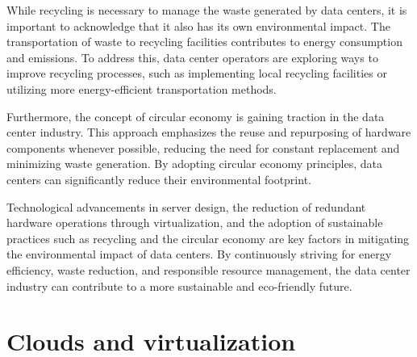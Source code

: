 \documentclass[
  a4paper,  %
  twoside,  %
  bibliography=totoc,
  headsepline,
  cleardoublepage=empty,
  parskip=half,
  draft=false
]{scrbook}
\begin{document}
While recycling is necessary to manage the waste generated by data centers, it is important to acknowledge that it also has its own environmental impact. The transportation of waste to recycling facilities contributes to energy consumption and emissions. To address this, data center operators are exploring ways to improve recycling processes, such as implementing local recycling facilities or utilizing more energy-efficient transportation methods.

Furthermore, the concept of circular economy is gaining traction in the data center industry. This approach emphasizes the reuse and repurposing of hardware components whenever possible, reducing the need for constant replacement and minimizing waste generation. By adopting circular economy principles, data centers can significantly reduce their environmental footprint.

Technological advancements in server design, the reduction of redundant hardware operations through virtualization, and the adoption of sustainable practices such as recycling and the circular economy are key factors in mitigating the environmental impact of data centers. By continuously striving for energy efficiency, waste reduction, and responsible resource management, the data center industry can contribute to a more sustainable and eco-friendly future.



\chapter{Clouds and virtualization}
\end{document}
